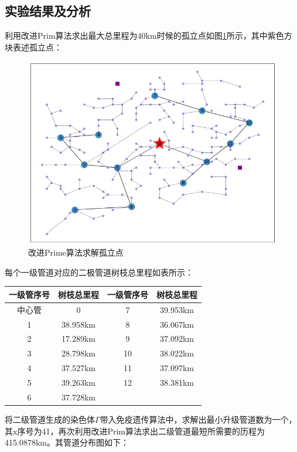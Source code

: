 \documentclass{whutmod}
\begin{document}
  	\subsection{实验结果及分析}
  	利用改进Prim算法求出最大总里程为40km时候的孤立点如图\ref{gld}所示，其中紫色方块表述孤立点：
  	 \begin{figure}[H]
  		\centering
  		\includegraphics[width=.7\textwidth]{figures/gld.png}
  		\caption{改进Prime算法求解孤立点}\label{gld}
  	\end{figure}
    每个一级管道对应的二极管道树枝总里程如表所示：
  \begin{table}[H]
  	\centering
  	\begin{tabular}{cccc}
  		\toprule[1.5pt]
  		\multicolumn{1}{m{3cm}}{\centering 一级管序号} & \multicolumn{1}{m{3cm}}{\centering 树枝总里程} &
  		\multicolumn{1}{m{3cm}}{\centering 一级管序号} &
  		\multicolumn{1}{m{3cm}}{\centering 树枝总里程} \\
  		\midrule[0.5pt]		
  		中心管 & 0 &7&39.953km \\ 
  		1  & 38.958km &8& 36.067km\\ 
  		2  & 17.289km &9&37.092km\\ 
  		3  & 28.798km &10& 38.022km\\ 
  		4 & 37.527km &11&37.097km \\ 
  		5  &39.263km &12& 38.381km\\ 
  		6  &37.728km &&\\ 
  		\bottomrule[1.5pt]
  	\end{tabular}
  \end{table}
  
  	将二级管道生成的染色体$\Gamma$带入免疫遗传算法中，求解出最小升级管道数为一个，其x序号为41，再次利用改进Prim算法求出二级管道最短所需要的历程为415.0878km。其管道分布图如下：
  	
\end{document}
